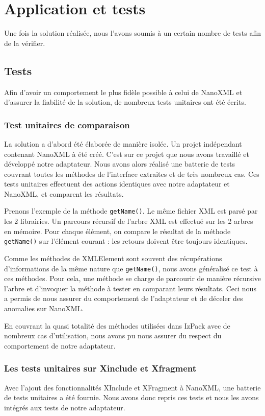 \section{Application et tests}
Une fois la solution réalisée, nous l'avons soumis à un certain nombre de tests afin de la vérifier.
\subsection{Tests}
Afin d'avoir un comportement le plus fidèle possible à celui de NanoXML et d'assurer la fiabilité de la solution, de nombreux tests unitaires ont été écrits.
\subsubsection{Test unitaires de comparaison}
La solution a d'abord été élaborée de manière isolée.
Un projet indépendant contenant NanoXML à été créé.
C'est sur ce projet que nous avons travaillé et développé notre adaptateur.
Nous avons alors réalisé une batterie de tests couvrant toutes les méthodes de l'interface extraites et de très nombreux cas.
Ces tests unitaires effectuent des actions identiques avec notre adaptateur et NanoXML, et comparent les résultats.

Prenons l'exemple de la méthode \verb|getName()|. Le même fichier XML est parsé par les 2 librairies.
Un parcours récursif de l'arbre XML est effectué sur les 2 arbres en mémoire.
Pour chaque élément, on compare le résultat de la méthode \verb|getName()| sur l'élément courant : les retours doivent être toujours identiques.

Comme les méthodes de XMLElement sont souvent des récupérations d'informations de la même nature que \verb|getName()|, nous avons généralisé ce test à ces méthodes.
Pour cela, une méthode se charge de parcourir de manière récursive l'arbre et d'invoquer la méthode à tester en comparant leurs résultats.
Ceci nous a permis de nous assurer du comportement de l'adaptateur et de déceler des anomalies sur NanoXML.

En couvrant la quasi totalité des méthodes utilisées dans IzPack avec de nombreux cas d'utilisation, nous avons pu nous assurer du respect du comportement de notre adaptateur.

\subsubsection{Les tests unitaires sur Xinclude et Xfragment}
Avec l'ajout des fonctionnalités XInclude et XFragment à NanoXML, une batterie de tests unitaires a été fournie.
Nous avons donc repris ces tests et nous les avons intégrés aux tests de notre adaptateur.

